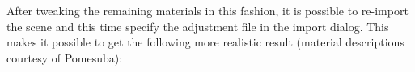 After tweaking the remaining materials in this fashion, it is possible to re-import the scene and this time specify the adjustment file in the import dialog.
This makes it possible to get the following more realistic result (material descriptions courtesy of Pomesuba):
\begin{center}
\end{center}
